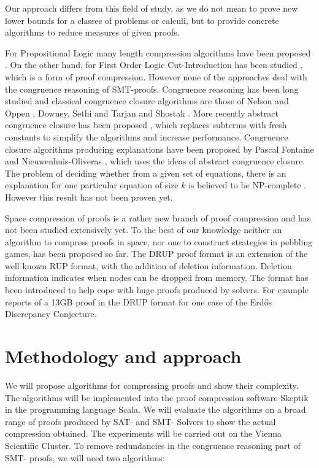 Our approach differs from this field of study, as we do not mean to prove new lower bounds for a classes of problems or calculi, but to provide concrete algorithms to reduce measures of given proofs.

For Propositional Logic many length compression algorithms have been proposed \cite{Bar-Ilan2008,Bloem,Boudou2013,Cotton2010,Fontaine2011}. 
On the other hand, for First Order Logic Cut-Introduction has been studied \cite{Hetzl2012}, which is a form of proof compression. However none of the approaches deal with the congruence reasoning of SMT-proofs. 
Congruence reasoning has been long studied and classical congruence closure algorithms are those of Nelson and Oppen \cite{Nelson1980}, Downey, Sethi and Tarjan \cite{Downey1980} and Shostak \cite{Shostak1978}.
More recently abstract congruence closure has been proposed \cite{Bachmair2000}, which replaces subterms with fresh constants to simplify the algorithms and increase performance.
Congruence closure algorithms producing explanations have been proposed by Pascal Fontaine \cite{Fontaine2004} and Nieuwenhuis-Oliveras \cite{Nieuwenhuis2007,Nieuwenhuis2005}, which uses the ideas of abstract congruence closure.
The problem of deciding whether from a given set of equations, there is an explanation for one particular equation of size $k$ is believed to be NP-complete \cite{Nieuwenhuis2007,Nieuwenhuis2005}.
However this result has not been proven yet.

Space compression of proofs is a rather new branch of proof compression and has not been studied extensively yet.
To the best of our knowledge neither an algorithm to compress proofs in space, nor one to construct strategies in pebbling games, has been proposed so far. 
The DRUP proof format \cite{Heule2013} is an extension of the well known RUP format, with the addition of deletion information. 
Deletion information indicates when nodes can be dropped from memory.
The format has been introduced to help cope with huge proofs produced by solvers. 
For example \cite{Konev2014} reports of a 13GB proof in the DRUP format for one case of the Erd\H{o}s Discrepancy Conjecture.

\section{Methodology and approach}

We will propose algorithms for compressing proofs and show their complexity.
The algorithms will be implemented into the proof compression software Skeptik \cite{Boudou} in the programming language Scala.
We will evaluate the algorithms on a broad range of proofs produced by SAT- and SMT- Solvers to show the actual compression obtained.
The experiments will be carried out on the Vienna Scientific Cluster.
To remove redundancies in the congruence reasoning part of SMT- proofs, we will need two algorithms:


